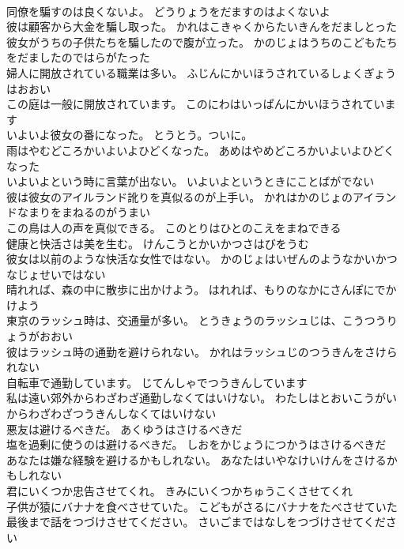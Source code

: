 \documentclass[8pt]{extreport}
\begin{document}
\begin{CJK}{UTF8}{min}
\\	同僚を騙すのは良くないよ。	どうりょうをだますのはよくないよ 
\\	彼は顧客から大金を騙し取った。	かれはこきゃくからたいきんをだましとった 
\\	彼女がうちの子供たちを騙したので腹が立った。	かのじょはうちのこどもたちをだましたのではらがたった 
\\	婦人に開放されている職業は多い。	ふじんにかいほうされているしょくぎょうはおおい 
\\	この庭は一般に開放されています。	このにわはいっぱんにかいほうされています 
\\	いよいよ彼女の番になった。	とうとう。ついに。
\\	雨はやむどころかいよいよひどくなった。	あめはやめどころかいよいよひどくなった 
\\	いよいよという時に言葉が出ない。	いよいよというときにことばがでない 
\\	彼は彼女のアイルランド訛りを真似るのが上手い。	かれはかのじょのアイランドなまりをまねるのがうまい 
\\	この鳥は人の声を真似できる。	このとりはひとのこえをまねできる 
\\	健康と快活さは美を生む。	けんこうとかいかつさはびをうむ 
\\	彼女は以前のような快活な女性ではない。	かのじょはいぜんのようなかいかつなじょせいではない 
\\	晴れれば、森の中に散歩に出かけよう。	はれれば、もりのなかにさんぽにでかけよう 
\\	東京のラッシュ時は、交通量が多い。	とうきょうのラッシュじは、こうつうりょうがおおい 
\\	彼はラッシュ時の通勤を避けられない。	かれはラッシュじのつうきんをさけられない 
\\	自転車で通勤しています。	じてんしゃでつうきんしています 
\\	私は遠い郊外からわざわざ通勤しなくてはいけない。	わたしはとおいこうがいからわざわざつうきんしなくてはいけない 
\\	悪友は避けるべきだ。	あくゆうはさけるべきだ 
\\	塩を過剰に使うのは避けるべきだ。	しおをかじょうにつかうはさけるべきだ 
\\	あなたは嫌な経験を避けるかもしれない。	あなたはいやなけいけんをさけるかもしれない 
\\	君にいくつか忠告させてくれ。	きみにいくつかちゅうこくさせてくれ 
\\	子供が猿にバナナを食べさせていた。	こどもがさるにバナナをたべさせていた 
\\	最後まで話をつづけさせてください。	さいごまではなしをつづけさせてください 

\end{CJK}
\end{document}
